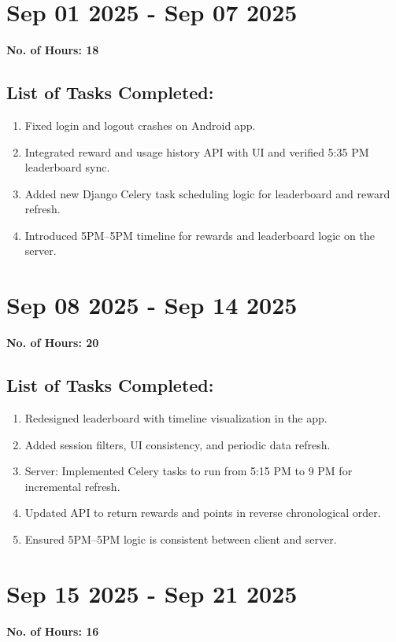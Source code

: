 \documentclass[12pt]{article}
\begin{document}
    \section{Sep 01 2025 - Sep 07 2025}
    {\bf No. of Hours: 18}
    \subsection{List of Tasks Completed:}
    \begin{enumerate}
        \item Fixed login and logout crashes on Android app.
        \item Integrated reward and usage history API with UI and verified 5:35 PM leaderboard sync.
        \item Added new Django Celery task scheduling logic for leaderboard and reward refresh.
        \item Introduced 5PM–5PM timeline for rewards and leaderboard logic on the server.
    \end{enumerate}
    
    \section{Sep 08 2025 - Sep 14 2025}
    {\bf No. of Hours: 20}
    \subsection{List of Tasks Completed:}
    \begin{enumerate}
        \item Redesigned leaderboard with timeline visualization in the app.
        \item Added session filters, UI consistency, and periodic data refresh.
        \item Server: Implemented Celery tasks to run from 5:15 PM to 9 PM for incremental refresh.
        \item Updated API to return rewards and points in reverse chronological order.
        \item Ensured 5PM–5PM logic is consistent between client and server.
    \end{enumerate}
    
    \section{Sep 15 2025 - Sep 21 2025}
    {\bf No. of Hours: 16}
\end{document}
